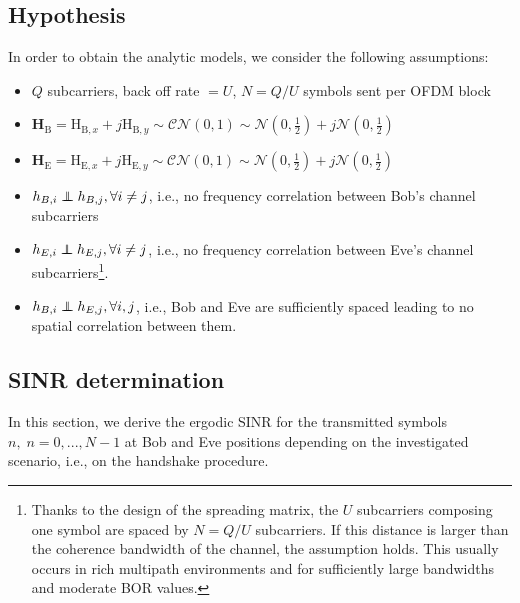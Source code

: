 \documentclass[journal,comsoc]{IEEEtran}
\newcommand{\HE}{\textbf{H}_{\text{E}}}
\newcommand{\HB}{\textbf{H}_{\text{B}}}
\newcommand{\mat}[1]{\boldsymbol{\mathrm{#1}}}
\newcommand\independent{\protect\mathpalette{\protect\independenT}{\perp}}
\def\independenT#1#2{\mathrel{\rlap{$#1#2$}\mkern2mu{#1#2}}}
\begin{document}

\subsection{Hypothesis}
In order to obtain the analytic models, we consider the following assumptions:
\begin{itemize}
	\item $Q$ subcarriers, back off rate $= U$, $N = Q/U$ symbols sent per OFDM block
	\item  $\HB = \mat{H}_{\text{B},x} + j\mat{H}_{\text{B},y} \sim \mathcal{CN}(0,1) \sim \mathcal{N}(0,\frac{1}{2}) + j \mathcal{N}(0,\frac{1}{2}) $
	\item  $\HE = \mat{H}_{\text{E},x} + j\mat{H}_{\text{E},y} \sim \mathcal{CN}(0,1) \sim \mathcal{N}(0,\frac{1}{2}) + j \mathcal{N}(0,\frac{1}{2}) $
	\item $h_{B,i} \independent h_{B,j}, \forall i \neq j$, i.e., no frequency correlation between Bob's channel subcarriers
	\item $h_{E,i} \independent h_{E,j}, \forall i \neq j$, i.e., no frequency correlation between Eve's channel subcarriers\footnote{Thanks to the design of the spreading matrix, the $U$ subcarriers composing one symbol are spaced by $N = Q/U$ subcarriers. If this distance is larger than the coherence bandwidth of the channel, the assumption holds. This usually occurs in rich multipath environments and for sufficiently large bandwidths and moderate BOR values.}.
	\item $h_{B,i} \independent h_{E,j}, \forall i,j$, i.e., Bob and Eve are sufficiently spaced leading to no spatial correlation between them.
\end{itemize}


\subsection{SINR determination}
In this section, we derive the ergodic SINR for the transmitted symbols $n, \; n = 0,...,N-1$ at Bob and Eve positions depending on the investigated scenario, i.e., on the handshake procedure. 



\end{document}
